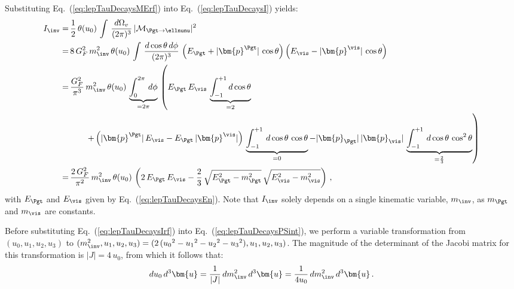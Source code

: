 Substituting Eq.~(\ref{eq:lepTauDecaysMErf}) into Eq.~(\ref{eq:lepTauDecaysI}) yields:
\begin{align}
I_{\inv} 
= & \, \frac{1}{2} \, \theta ( u_{0} ) \, \int \, \frac{d\Omega_{v}}{(2\pi)^{3}} \, \vert\mathcal{M}_{\Pgt \to
  \ellnunu}\vert^{2} \nonumber \\
= & \, 8 \, G^{2}_{F} \, m^{2}_{\inv} \, \theta ( u_{0} ) \, \int \, \frac{d\cos\theta \, d\phi}{(2\pi)^{3}} \, 
  \left( E_{\Pgt} + \vert\bm{p}^{\Pgt}\vert \, \cos\theta \right)  \left( E_{\vis} - \vert\bm{p}^{\vis}\vert \, \cos\theta \right) \nonumber \\
= & \, \frac{G^{2}_{F}}{\pi^{3}} \, m^{2}_{\inv} \, \theta ( u_{0} ) \, \underbrace{\int_{0}^{2 \pi} \, d\phi}_{= 2 \pi} \, 
  \left( E_{\Pgt} \, E_{\vis} \, \underbrace{\int_{-1}^{+1}
      d\cos\theta}_{= 2} \right. \nonumber \\
& \qquad
     \left. + \left( \vert\bm{p}^{\Pgt}\vert \, E_{\vis} - E_{\Pgt} \,
       \vert\bm{p}^{\vis}\vert \right) \,
     \underbrace{\int_{-1}^{+1} \, d\cos\theta \, \cos\theta}_{= 0} 
  - \vert\bm{p}_{\Pgt}\vert \, \vert\bm{p}_{\vis}\vert
       \, \underbrace{\int_{-1}^{+1} \, d\cos\theta \, \cos^{2}\theta}_{= \frac{2}{3}} \right) \nonumber \\
= & \, \frac{2 \, G^{2}_{F}}{\pi^{2}} \, m^{2}_{\inv} \, \theta ( u_{0} ) \, 
  \left( 2 \, E_{\Pgt} \, E_{\vis} - \frac{2}{3} \, \sqrt{E^{2}_{\Pgt} - m^{2}_{\Pgt}} \, \sqrt{E^{2}_{\vis} - m^{2}_{\vis}} \right) \, ,
\label{eq:lepTauDecaysIrf}
\end{align}
with $E_{\Pgt}$ and $E_{\vis}$ given by Eq.~(\ref{eq:lepTauDecaysEn}).
Note that $I
_{\inv}$ solely depends on a single kinematic variable, $m_{\inv}$, 
as $m_{\Pgt}$ and $m_{\vis}$ are constants.

Before substituting Eq.~(\ref{eq:lepTauDecaysIrf}) into Eq.~(\ref{eq:lepTauDecaysPSint}),
we perform a variable transformation from $( u_{0}, u_{1}, u_{2}, u_{3} )$ to $( m^{2}_{\inv}, u_{1}, u_{2}, u_{3} ) = ( 2 \, ( {u_{0}}^{2} - {u_{1}}^{2} - {u_{2}}^{2} - {u_{3}}^{2}), u_{1}, u_{2}, u_{3} )$.
The magnitude of the determinant of the Jacobi matrix for this transformation is $\vert J
\vert = 4 \, u_{0}$,
from which it follows that:
\begin{equation}
du_{0} \, d^{3}\bm{u} = \frac{1}{\vert J \vert} \, dm^{2}_{\inv} \,
d^{3}\bm{u} = \frac{1}{4 u_{0}} \, dm^{2}_{\inv} \, d^{3}\bm{u} \, .
\label{eq:lepTauDecaysJacobi}
\end{equation}

